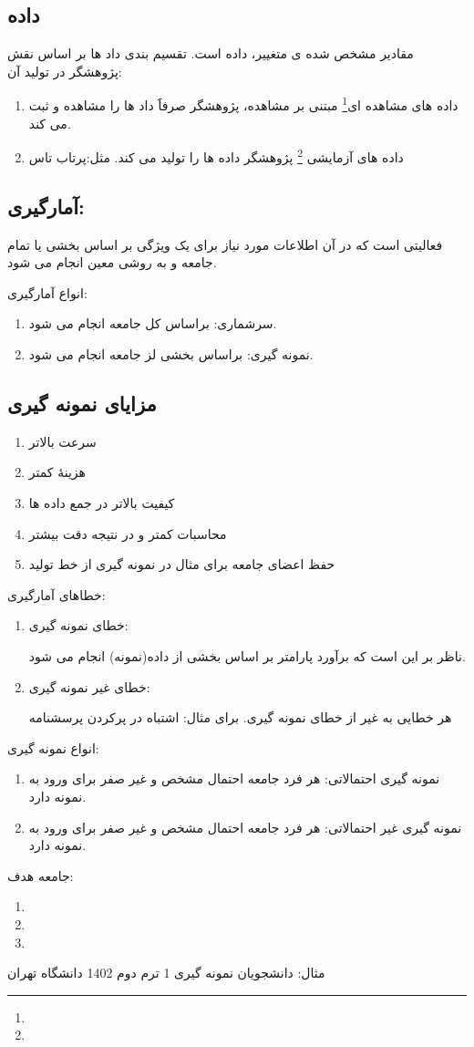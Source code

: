 \subsection*{داده}
مقادیر مشخص شده ی متغییر، داده است.
تقسیم بندی داد ها بر اساس نقش پژوهشگر در تولید آن:
\begin{enumerate}
	\item داده های مشاهده ای\footnote{}
	مبتنی بر مشاهده، پژوهشگر صرفاََ داد ها را مشاهده و ثبت می کند.
	\item داده های آزمایشی \footnote{}
	پژوهشگر داده ها را تولید می کند.
	مثل:پرتاب تاس
\end{enumerate}
\subsection*{آمارگیری:}
فعالیتی است که در آن اطلاعات مورد نیاز برای یک ویژگی بر اساس بخشی یا تمام جامعه و به روشی معین انجام می شود.

انواع آمارگیری:
\begin{enumerate}
	\item سرشماری: براساس کل جامعه انجام می شود.
	\item  نمونه گیری: براساس بخشی لز جامعه انجام می شود.
\end{enumerate}
\subsection*{مزایای نمونه گیری}
\begin{enumerate}
	\item سرعت بالاتر
	\item هزینۀ کمتر
	\item کیفیت بالاتر در جمع داده ها
	\item محاسبات کمتر و در نتیجه دقت بیشتر
	\item حفظ اعضای جامعه برای مثال در نمونه گیری از خط تولید
\end{enumerate}
خطاهای آمارگیری:
\begin{enumerate}
	\item خطای نمونه گیری: 
	
	ناظر بر این است که برآورد پارامتر بر اساس بخشی از داده(نمونه) انجام می شود.
	\item خطای غیر نمونه گیری: 
	
	هر خطایی به غیر از خطای نمونه گیری. برای مثال: اشتباه در پرکردن پرسشنامه
\end{enumerate}
انواع نمونه گیری:
\begin{enumerate}
	\item نمونه گیری احتمالاتی:
	هر فرد جامعه احتمال مشخص و غیر صفر برای ورود به نمونه دارد.
	\item نمونه گیری غیر احتمالاتی: 
	هر فرد جامعه احتمال مشخص و غیر صفر برای ورود به نمونه دارد.
\end{enumerate}
جامعه هدف:
\begin{enumerate}
	\item {}
	\item {}
	\item {}
\end{enumerate}
مثال: دانشجویان نمونه گیری 1 ترم دوم 1402 دانشگاه تهران

